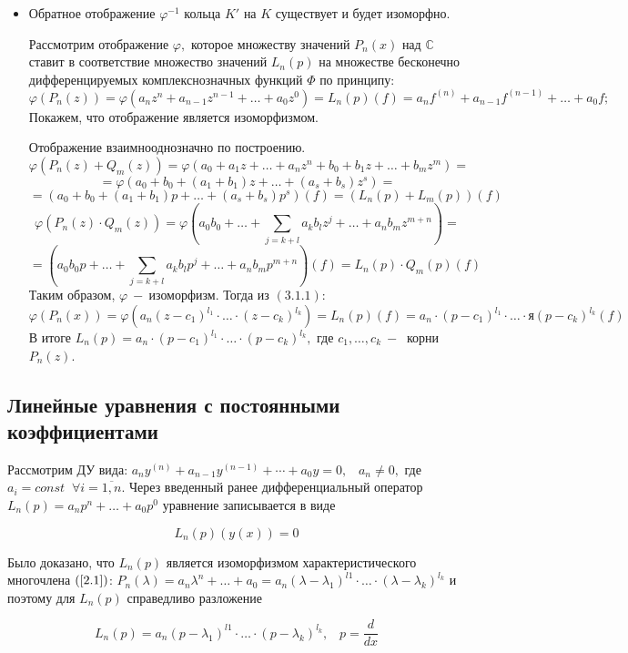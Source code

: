 \begin{itemize}
    \item Обратное отображение $\varphi^{-1}$ кольца $K'$ на $K$ существует и будет изоморфно.\par
    Рассмотрим отображение $\varphi,$ которое множеству значений $P_n(x)$ над $\mathds{C}$ ставит в соответствие множество значений $L_n(p)$ на множестве бесконечно дифференцируемых комплекснозначных функций $\varPhi$ по принципу:
    $$\varphi(P_n(z))=\varphi(a_nz^n+a_{n-1}z^{n-1}+\dots+a_0z^0)=L_n(p)(f)=a_nf^{(n)}+a_{n-1}f^{(n-1)}+\dots+a_0f;$$
    Покажем, что отображение является изоморфизмом.\par Отображение взаимнооднозначно по построению.
    $$\varphi(P_n(z)+Q_m(z))=\varphi(a_0+a_1z+\dots+a_nz^n+b_0+b_1z+\dots+b_mz^m)=$$
    $$=\varphi(a_0+b_0+(a_1+b_1)z+\dots+(a_s+b_s)z^s)=$$
    $$=(a_0+b_0+(a_1+b_1)p+\dots+(a_s+b_s)p^s)(f)=(L_n(p)+L_m(p))(f)$$
    $$\varphi(P_n(z)\cdot Q_m(z))=\varphi(a_0b_0+\dots+ \displaystyle\sum_{j=k+l}a_kb_lz^j+\dots+a_nb_mz^{m+n})=$$
    $$=(a_0b_0p+\dots+\displaystyle\sum_{j=k+l}a_kb_lp^j+\dots+a_nb_mp^{m+n})(f)=L_n(p)\cdot Q_m(p)(f)$$
    Таким образом, $\varphi~-~$изоморфизм. Тогда из $(3.1.1)$: $$\varphi(P_n(x))=\varphi(a_n(z-c_1)^{l_1}\cdot \dots\cdot (z-c_k)^{l_k})= L_n(p)(f)=a_n\cdot (p-c_1)^{l_1}\cdot \dots \cdot я(p-c_k)^{l_k}(f)$$
    В итоге  $L_n(p)=a_n\cdot (p-c_1)^{l_1}\cdot \dots \cdot (p-c_k)^{l_k},$ где $c_1, \dots, c_k ~-~$ корни $P_n(z)$.
\end{itemize}

\subsection{Линейные уравнения с поcтоянными коэффициентами}

Рассмотрим ДУ вида: $a_n y^{(n)}+a_{n-1}y^{(n-1)} + \cdots +a_0y=0, \;\;\;a_n \neq 0, $ где $a_i=const\;\;\forall i=\overline{1, n}.$ Через введенный ранее дифференциальный оператор $L_n(p)=a_np^n+ \dots + a_0 p^0$ уравнение записывается в виде

\begin{equation}\tag{2.1}
\label{2.1}
    L_n(p)(y(x))=0
\end{equation}

Было доказано, что $L_n(p)$ является изоморфизмом характеристического многочлена $(\ref{2.1})$: $P_n(\lambda)=a_n\lambda^n+\dots+a_0=a_n(\lambda-\lambda_1)^{l1}\cdot \dots \cdot (\lambda-\lambda_{k})^{l_k}$ и поэтому для $L_n(p)$ справедливо разложение

\begin{equation}
    \tag{2.2}
    \label{2.2}
    L_n(p)=a_n(p-\lambda_1)^{l1}\cdot \dots \cdot (p-\lambda_{k})^{l_k}, \;\;\;p=\frac{d}{dx}
\end{equation}

